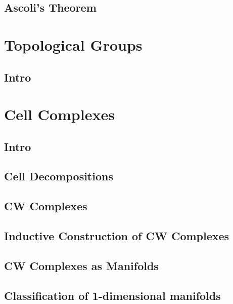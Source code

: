 \subsection{Ascoli's Theorem}
\label{subsection-Ascoli-theorem}

\section{Topological Groups}
\label{section-topological-groups}

\subsection{Intro}
\label{subsection-topological-groups-intro}

\section{Cell Complexes}
\label{section-cell-complexes}

\subsection{Intro}
\label{subsection-intro}

\subsection{Cell Decompositions}
\label{subsection-cell-decompositions}

\subsection{CW Complexes}
\label{subsection-CW-complexes}

\subsection{Inductive Construction of CW Complexes}
\label{subsection-inductive-construction-of-CW-complexes}

\subsection{CW Complexes as Manifolds}
\label{subsection-CW-complexes-as-manifolds}

\subsection{Classification of 1-dimensional manifolds}
\label{subsection-classification-of-1-dimensional-manifolds}

